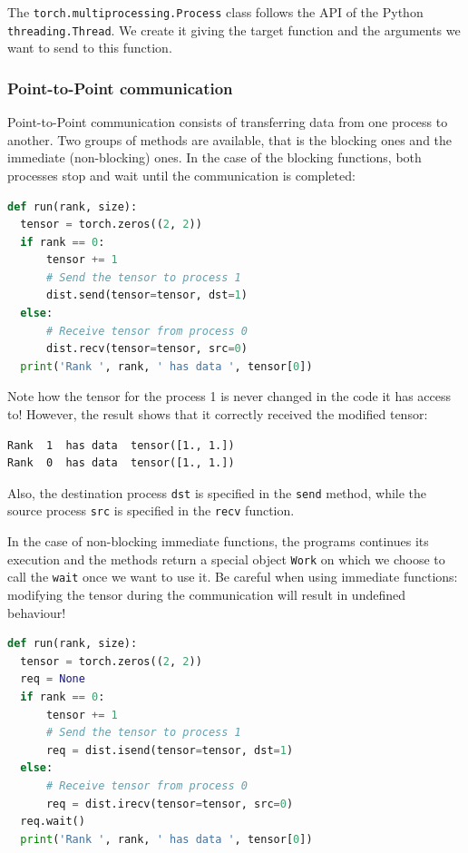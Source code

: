 \documentclass{article}
\begin{document}
The \lstinline{torch.multiprocessing.Process} class follows the API of the Python \lstinline{threading.Thread}. We create it giving the target function and the arguments we want to send to this function.

\subsubsection{Point-to-Point communication}
Point-to-Point communication consists of transferring data from one process to another. Two groups of methods are available, that is the blocking ones and the immediate (non-blocking) ones. In the case of the blocking functions, both processes stop and wait until the communication is completed:

\begin{lstlisting}[language=Python]
def run(rank, size):
  tensor = torch.zeros((2, 2))
  if rank == 0:
      tensor += 1
      # Send the tensor to process 1
      dist.send(tensor=tensor, dst=1)
  else:
      # Receive tensor from process 0
      dist.recv(tensor=tensor, src=0)
  print('Rank ', rank, ' has data ', tensor[0])
\end{lstlisting}
Note how the tensor for the process 1 is never changed in the code it has access to! However, the result shows that it correctly received the modified tensor:
\begin{lstlisting}
Rank  1  has data  tensor([1., 1.])
Rank  0  has data  tensor([1., 1.])
\end{lstlisting}
Also, the destination process \lstinline{dst} is specified in the \lstinline{send} method, while the source process \lstinline{src} is specified in the \lstinline{recv} function.

In the case of non-blocking immediate functions, the programs continues its execution and the methods return a special object \lstinline{Work} on which we choose to call the \lstinline{wait} once we want to use it. Be careful when using immediate functions: modifying the tensor during the communication will result in undefined behaviour!

\begin{lstlisting}[language=Python]
def run(rank, size):
  tensor = torch.zeros((2, 2))
  req = None
  if rank == 0:
      tensor += 1
      # Send the tensor to process 1
      req = dist.isend(tensor=tensor, dst=1)
  else:
      # Receive tensor from process 0
      req = dist.irecv(tensor=tensor, src=0)
  req.wait()
  print('Rank ', rank, ' has data ', tensor[0])
\end{lstlisting}
\end{document}
